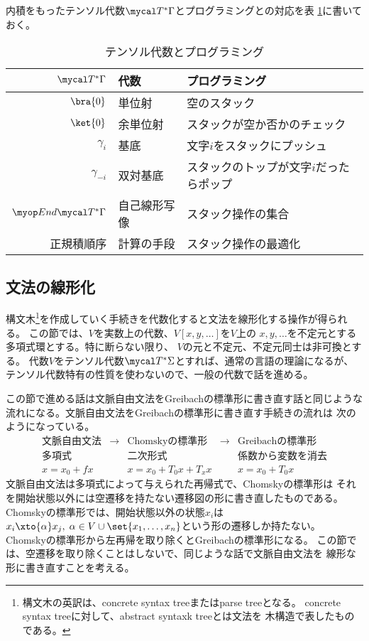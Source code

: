 {	内積をもったテンソル代数$\T^*\Gamma$とプログラミングとの対応を表
	\ref{table:テンソル代数とプログラミング}に書いておく。
	\begin{table}[htbp] %
		\begin{center}\begin{tabular}{rll} \hline
			$\T^*\Gamma$ & 代数 & プログラミング \\\hline
			$\bra{0}$ & 単位射 & 空のスタック \\
			$\ket{0}$ & 余単位射 & スタックが空か否かのチェック\\
			$\gamma_i$ & 基底 & 文字$i$をスタックにプッシュ\\
			$\gamma_{-i}$ & 双対基底 & スタックのトップが文字$i$だったらポップ \\
			$\End\T^*\Gamma$ & 自己線形写像 & スタック操作の集合 \\
			正規積順序 & 計算の手段 & スタック操作の最適化 \\
		\end{tabular}\end{center}
		\caption{テンソル代数とプログラミング}
		\label{table:テンソル代数とプログラミング}
	\end{table} %
\subsection{文法の線形化}\label{s2:文法の線形化} %
	構文木\footnote{
		構文木の英訳は、concrete syntax treeまたはparse treeとなる。
		concrete syntax treeに対して、abstract syntaxk treeとは文法を
		木構造で表したものである。
	}を作成していく手続きを代数化すると文法を線形化する操作が得られる。
	この節では、$V$を実数上の代数、$V[x,y,\dots]$を$V$上の
	$x,y,\dots$を不定元とする多項式環とする。特に断らない限り、
	$V$の元と不定元、不定元同士は非可換とする。
	代数$V$をテンソル代数$\T^*\Sigma$とすれば、通常の言語の理論になるが、
	テンソル代数特有の性質を使わないので、一般の代数で話を進める。

	この節で進める話は文脈自由文法をGreibachの標準形に書き直す話と同じような
	流れになる。文脈自由文法をGreibachの標準形に書き直す手続きの流れは
	次のようになっている。
	\begin{equation*}\begin{array}{lclcl}
		\text{文脈自由文法} &\to& \text{Chomskyの標準形} 
		&\to& \text{Greibachの標準形} \\
		\text{多項式} && \text{二次形式} && \text{係数から変数を消去} \\
		x = x_0 + fx && x = x_0 + T_0x + T_xx && x = x_0 + T_0x
	\end{array}\end{equation*}
	文脈自由文法は多項式によって与えられた再帰式で、Chomskyの標準形は
	それを開始状態以外には空遷移を持たない遷移図の形に書き直したものである。
	Chomskyの標準形では、開始状態以外の状態$x_i$は$x_i\xto{\alpha}x_j,\;
	\alpha\in V\cup\set{x_1,\dots,x_n}$という形の遷移しか持たない。
	Chomskyの標準形から左再帰を取り除くとGreibachの標準形になる。
	この節では、空遷移を取り除くことはしないで、同じような話で文脈自由文法を
	線形な形に書き直すことを考える。

}
